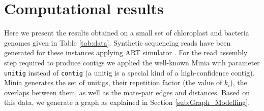 \section{Computational results}

Here we present the results obtained on a small set of chloroplast and bacteria  genomes given in Table \ref{tab:data}.  Synthetic sequencing reads have been generated  for these instances applying ART simulator \cite{Huang15022012}. For the read assembly step required to produce contigs  we applied  the well-known \textnormal Minia \cite{minia} with  parameter  {\tt unitig} instead of {\tt contig} (a unitig is a special  kind of a high-confidence contig).
Minia generates  the set of  unitigs, their repetition factor (the value of $k_i$),  the overlaps between them, as well as the  mate-pair edges and distances.  Based on this data, we generate a graph as explained in Section \ref{sub:Graph_Modelling}. 


 
  
   
